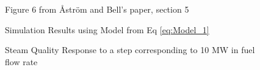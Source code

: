         \begin{figure}[ht]
            \begin{center}
                
                Figure 6 from \r{A}str\"{o}m and Bell's paper, section 5 \cite{Astrom}    
                
                
                Simulation Results using Model from Eq \eqref{eq:Model_1}
                
                \caption{Steam Quality Response to a step corresponding to 10 MW in fuel flow rate}
                \label{fig:Fig6F}
            \end{center}
        \end{figure}  %

